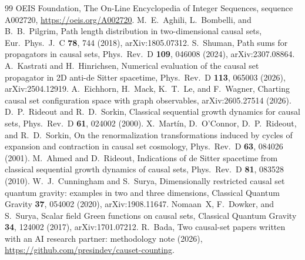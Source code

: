 \documentclass[prd,twocolumn,superscriptaddress,nofootinbib,amsmath,amssymb,floatfix]{revtex4-2}
\begin{document}
\begin{thebibliography}{99}
 OEIS Foundation, The On-Line Encyclopedia of Integer Sequences, sequence A002720, \url{https://oeis.org/A002720}.
 M.~E.~Aghili, L.~Bombelli, and B.~B.~Pilgrim, Path length distribution in two-dimensional causal sets, Eur.\ Phys.\ J.\ C \textbf{78}, 744 (2018), arXiv:1805.07312.
 S.~Shuman, Path sums for propagators in causal sets, Phys.\ Rev.\ D \textbf{109}, 046008 (2024), arXiv:2307.08864.
 A.~Kastrati and H.~Hinrichsen, Numerical evaluation of the causal set propagator in 2D anti-de Sitter spacetime, Phys.\ Rev.\ D \textbf{113}, 065003 (2026), arXiv:2504.12919.
 A.~Eichhorn, H.~Mack, K.~T.~Le, and F.~Wagner, Charting causal set configuration space with graph observables, arXiv:2605.27514 (2026).
 D.~P.~Rideout and R.~D.~Sorkin, Classical sequential growth dynamics for causal sets, Phys.\ Rev.\ D \textbf{61}, 024002 (2000).
 X.~Mart\'in, D.~O'Connor, D.~P.~Rideout, and R.~D.~Sorkin, On the renormalization transformations induced by cycles of expansion and contraction in causal set cosmology, Phys.\ Rev.\ D \textbf{63}, 084026 (2001).
 M.~Ahmed and D.~Rideout, Indications of de Sitter spacetime from classical sequential growth dynamics of causal sets, Phys.\ Rev.\ D \textbf{81}, 083528 (2010).
 W.~J.~Cunningham and S.~Surya, Dimensionally restricted causal set quantum gravity: examples in two and three dimensions, Classical Quantum Gravity \textbf{37}, 054002 (2020), arXiv:1908.11647.
 Nomaan~X, F.~Dowker, and S.~Surya, Scalar field Green functions on causal sets, Classical Quantum Gravity \textbf{34}, 124002 (2017), arXiv:1701.07212.
 R.~Bada, Two causal-set papers written with an AI research partner: methodology note (2026), \url{https://github.com/presindev/causet-counting}.
\end{thebibliography}
\end{document}
